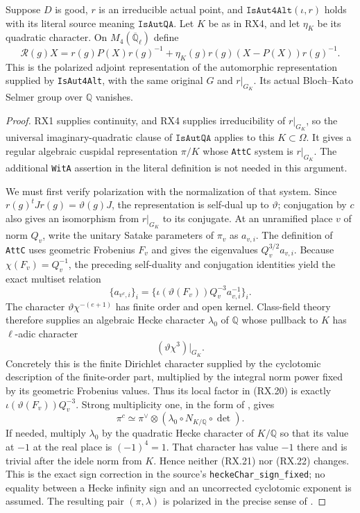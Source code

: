 \begin{proposition}
\label{prop:rx-adjoint-vanishing}
Suppose $D$ is good, $r$ is an irreducible actual point, and
$\texttt{IsAut4Alt}(\iota,r)$ holds with its literal source meaning
$\texttt{IsAutQA}$.  Let $K$ be as in RX4, and let $\eta_K$ be
its quadratic character.  On $M_4(\overline{\mathbb Q}_\ell)$ define
\[
 \mathcal R(g)X
   =r(g)P(X)r(g)^{-1}
       +\eta_K(g)r(g)(X-P(X))r(g)^{-1}.
 \tag{RX.19}
\]
This is the polarized adjoint representation of the automorphic
representation supplied by \texttt{IsAut4Alt}, with the same
original $G$ and $r|_{G_K}$.  Its actual Bloch--Kato Selmer group
over $\mathbb Q$ vanishes.
\end{proposition}

\begin{proof}
RX1 supplies continuity, and RX4 supplies irreducibility of
$r|_{G_K}$, so the universal imaginary-quadratic clause of
$\texttt{IsAutQA}$ applies to this $K\subset\Omega$.
It gives a regular algebraic cuspidal representation $\pi/K$
whose \texttt{AttC} system is $r|_{G_K}$.
The additional \texttt{WitA} assertion in the literal definition
is not needed in this argument.

We must first verify polarization with the normalization of that
system.  Since $r(g)^tJr(g)=\vartheta(g)J$, the representation
is self-dual up to $\vartheta$; conjugation by $c$ also gives an
isomorphism from $r|_{G_K}$ to its conjugate.
At an unramified place $v$ of norm $Q_v$, write the unitary
Satake parameters of $\pi_v$ as $a_{v,i}$.
The definition of \texttt{AttC} uses geometric Frobenius $F_v$
and gives the eigenvalues $Q_v^{3/2}a_{v,i}$.
Because $\chi(F_v)=Q_v^{-1}$, the preceding self-duality and
conjugation identities yield the exact multiset relation
\[
 \{a_{v^c,i}\}_i
       =\{\iota(\vartheta(F_v))Q_v^{-3}a_{v,i}^{-1}\}_i.
 \tag{RX.20}
\]
The character $\vartheta\chi^{-(e+1)}$ has finite order and open
kernel.  Class-field theory therefore supplies an algebraic
Hecke character $\lambda_0$ of $\mathbb Q$ whose pullback to $K$
has $\ell$-adic character
\[
                    (\vartheta\chi^3)|_{G_K}.
 \tag{RX.21}
\]
Concretely this is the finite Dirichlet character supplied by the
cyclotomic description of the finite-order part, multiplied by
the integral norm power fixed by its geometric Frobenius values.
Thus its local factor in (RX.20) is exactly
$\iota(\vartheta(F_v))Q_v^{-3}$.
Strong multiplicity one, in the form of
\cite[Theorem~4.2]{RX-JS}, gives
\[
       \pi^c\simeq\pi^\vee\otimes
                    (\lambda_0\circ N_{K/\mathbb Q}\circ\det).
 \tag{RX.22}
\]
If needed, multiply $\lambda_0$ by the quadratic Hecke character
of $K/\mathbb Q$ so that its value at $-1$ at the real place is
$(-1)^4=1$.  That character has value $-1$ there and is trivial
after the idele norm from $K$.  Hence neither (RX.21) nor (RX.22)
changes.  This is the exact sign correction in the source's
\texttt{heckeChar\_sign\_fixed}; no equality between a Hecke
infinity sign and an uncorrected cyclotomic exponent is assumed.
The resulting pair $(\pi,\lambda)$ is polarized in the precise
sense of \cite[\S2.1]{RX-BLGGT}.


\end{proof}
